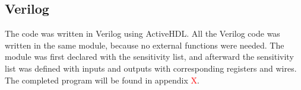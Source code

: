 \subsection{Verilog}
The code was written in Verilog using ActiveHDL. All the Verilog code was written in the same module, because no external functions were needed. The module was first declared with the sensitivity list, and afterward the sensitivity list was defined with inputs and outputs with corresponding registers and wires. The completed program will be found in appendix \textcolor{red}{X}.





\newpage